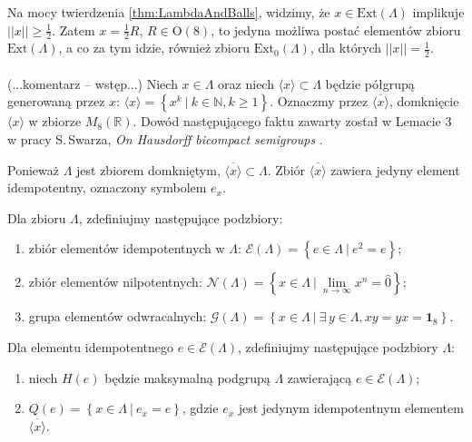 Na mocy twierdzenia \ref{thm:LambdaAndBalls},
widzimy, że $x \in \text{Ext}(\Lambda)$ implikuje
    $||x|| \geq \frac{1}{2}$.
Zatem $x = \frac{1}{2} R$, $R \in \mathrm{O}(8)$,
to jedyna możliwa postać elementów zbioru $\text{Ext}(\Lambda)$,
a co za tym idzie, również zbioru $\text{Ext}_{0}(\Lambda)$,
dla których $||x|| = \frac{1}{2}$.

\paragraph{}
(...komentarz -- wstęp...)
Niech $x \in \Lambda$ oraz niech
$\langle x \rangle \subset \Lambda$ będzie półgrupą generowaną przez $x$:
$\langle x \rangle = \left \{ x^{k} \: | \: k \in \mathbb{N}, k \geq 1 \right \}$.
Oznaczmy przez $\overline{\langle x \rangle}$,
domknięcie $\langle x \rangle$ w zbiorze $M_{8}(\mathbb{R})$.
Dowód następującego faktu zawarty został w Lemacie 3 w
pracy S.\,Swarza, \emph{On Hausdorff bicompact semigroups}
\cite{schwarz1955hausdorff}.

\begin{Theorem}
    \label{prop:UniqeClusterPoint}
    Ponieważ $\Lambda$ jest zbiorem domkniętym, $\overline{\langle x \rangle} \subset \Lambda$.
    Zbiór $\overline{\langle x \rangle}$ zawiera jedyny element idempotentny,
    oznaczony symbolem $e_{x}$.
\end{Theorem}

\begin{Definition}
    Dla zbioru $\Lambda$, zdefiniujmy następujące podzbiory:
    \begin{enumerate}
       \item zbiór elementów idempotentnych w $\Lambda$:
            $\mathcal{E}(\Lambda) = \left \{ e \in \Lambda \: |  \: e^{2} = e \right \}$;
       \item zbiór elementów nilpotentnych:
            $\mathcal{N}(\Lambda) = \left \{ x \in \Lambda \: |  \: \lim \limits_{n \rightarrow \infty} x^{n} = \hat{0} \right \}$;
       \item grupa elementów odwracalnych:
            $\mathcal{G}(\Lambda) = \left \{ x \in \Lambda \: |  \: \exists \, y \in \Lambda, xy = yx = \mathbf{1}_{8} \right \}$.
    \end{enumerate}
   Dla elementu idempotentnego $e \in \mathcal{E}(\Lambda)$,
   zdefiniujmy następujące podzbiory $\Lambda$:
   \begin{enumerate}
        \item niech $H(e)$ będzie maksymalną podgrupą $\Lambda$
            zawierającą $e \in \mathcal{E}(\Lambda)$;
        \item $Q(e) = \left \{ x \in \Lambda \: | \: e_{x} = e \right \}$,
        gdzie $e_{x}$ jest jedynym idempotentnym elementem
        $\overline{\langle x \rangle}$.
   \end{enumerate}
\end{Definition}

